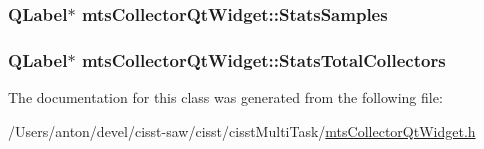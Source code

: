 \subsubsection[{Stats\+Samples}]{\setlength{\rightskip}{0pt plus 5cm}Q\+Label$\ast$ mts\+Collector\+Qt\+Widget\+::\+Stats\+Samples\hspace{0.3cm}{\ttfamily [protected]}}\label{classmts_collector_qt_widget_a3d293da33f4bca3bdc405690e63f634b}
\hypertarget{classmts_collector_qt_widget_a4f3f7becc4c3a89a36942ec8a8cc9b6c}{}
\subsubsection[{Stats\+Total\+Collectors}]{\setlength{\rightskip}{0pt plus 5cm}Q\+Label$\ast$ mts\+Collector\+Qt\+Widget\+::\+Stats\+Total\+Collectors\hspace{0.3cm}{\ttfamily [protected]}}\label{classmts_collector_qt_widget_a4f3f7becc4c3a89a36942ec8a8cc9b6c}


The documentation for this class was generated from the following file\+:\begin{DoxyCompactItemize}
\item 
/\+Users/anton/devel/cisst-\/saw/cisst/cisst\+Multi\+Task/\hyperlink{mts_collector_qt_widget_8h}{mts\+Collector\+Qt\+Widget.\+h}\end{DoxyCompactItemize}
